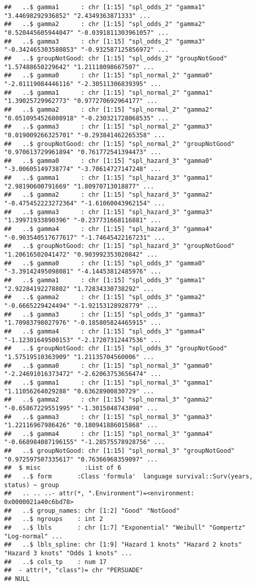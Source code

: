 \documentclass[
]{article}
\begin{document}
\begin{verbatim}
##   ..$ gamma1      : chr [1:15] "spl_odds_2" "gamma1" "3.44698292936852" "2.4349363871333" ...
##   ..$ gamma2      : chr [1:15] "spl_odds_2" "gamma2" "0.520445605944047" "-0.0391811303961057" ...
##   ..$ gamma3      : chr [1:15] "spl_odds_2" "gamma3" "-0.342465303580853" "-0.932587125856972" ...
##   ..$ groupNotGood: chr [1:15] "spl_odds_2" "groupNotGood" "1.57488650229642" "1.21118098667507" ...
##   ..$ gamma0      : chr [1:15] "spl_normal_2" "gamma0" "-2.01119084446116" "-2.30511306839395" ...
##   ..$ gamma1      : chr [1:15] "spl_normal_2" "gamma1" "1.39025729962773" "0.977270692964177" ...
##   ..$ gamma2      : chr [1:15] "spl_normal_2" "gamma2" "0.0510954526808918" "-0.230321728068535" ...
##   ..$ gamma3      : chr [1:15] "spl_normal_2" "gamma3" "0.019009266325701" "-0.293841462265358" ...
##   ..$ groupNotGood: chr [1:15] "spl_normal_2" "groupNotGood" "0.970613729961894" "0.761772541394473" ...
##   ..$ gamma0      : chr [1:15] "spl_hazard_3" "gamma0" "-3.00605149738774" "-3.70614727147248" ...
##   ..$ gamma1      : chr [1:15] "spl_hazard_3" "gamma1" "2.98190600791669" "1.80970713018877" ...
##   ..$ gamma2      : chr [1:15] "spl_hazard_3" "gamma2" "-0.475452223272364" "-1.61060043962154" ...
##   ..$ gamma3      : chr [1:15] "spl_hazard_3" "gamma3" "1.39971933890396" "-0.237731668116881" ...
##   ..$ gamma4      : chr [1:15] "spl_hazard_3" "gamma4" "-0.903540517677617" "-1.74645422167231" ...
##   ..$ groupNotGood: chr [1:15] "spl_hazard_3" "groupNotGood" "1.20616502041472" "0.903992353020842" ...
##   ..$ gamma0      : chr [1:15] "spl_odds_3" "gamma0" "-3.39142495098081" "-4.14453812485976" ...
##   ..$ gamma1      : chr [1:15] "spl_odds_3" "gamma1" "2.92284192278802" "1.72834330738292" ...
##   ..$ gamma2      : chr [1:15] "spl_odds_3" "gamma2" "-0.6665229424494" "-1.92153128928779" ...
##   ..$ gamma3      : chr [1:15] "spl_odds_3" "gamma3" "1.70983798027976" "-0.185805824465915" ...
##   ..$ gamma4      : chr [1:15] "spl_odds_3" "gamma4" "-1.12301649500153" "-2.17207312447536" ...
##   ..$ groupNotGood: chr [1:15] "spl_odds_3" "groupNotGood" "1.57519510363909" "1.21135704560006" ...
##   ..$ gamma0      : chr [1:15] "spl_normal_3" "gamma0" "-2.24691016373472" "-2.62063753656474" ...
##   ..$ gamma1      : chr [1:15] "spl_normal_3" "gamma1" "1.11056264029288" "0.63628900830729" ...
##   ..$ gamma2      : chr [1:15] "spl_normal_3" "gamma2" "-0.65867229551995" "-1.3015048743898" ...
##   ..$ gamma3      : chr [1:15] "spl_normal_3" "gamma3" "1.22116967986426" "0.180941886015868" ...
##   ..$ gamma4      : chr [1:15] "spl_normal_3" "gamma4" "-0.668984087196155" "-1.28575578928756" ...
##   ..$ groupNotGood: chr [1:15] "spl_normal_3" "groupNotGood" "0.972597507335617" "0.76366968359097" ...
##  $ misc            :List of 6
##   ..$ form       :Class 'formula'  language survival::Surv(years, status) ~ group
##   .. .. ..- attr(*, ".Environment")=<environment: 0x0000021a40c6bd78> 
##   ..$ group_names: chr [1:2] "Good" "NotGood"
##   ..$ ngroups    : int 2
##   ..$ lbls       : chr [1:7] "Exponential" "Weibull" "Gompertz" "Log-normal" ...
##   ..$ lbls_spline: chr [1:9] "Hazard 1 knots" "Hazard 2 knots" "Hazard 3 knots" "Odds 1 knots" ...
##   ..$ cols_tp    : num 17
##  - attr(*, "class")= chr "PERSUADE"
## NULL
\end{verbatim}
\end{document}

